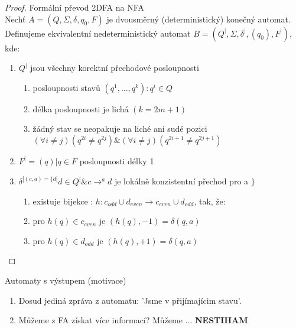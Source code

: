 \documentclass[../main.tex]{subfiles}
\begin{document}
\begin{theorem}
\begin{proof}
        Formální převod 2DFA na NFA\\

        Nechť $A = (Q,\Sigma, \delta, q_0,F)$ je dvousměrný (deterministický) konečný automat.
        Definujeme ekvivalentní nedeterministický automat $B = (Q^|,\Sigma,\delta^|,(q_0),F^|)$, kde:
        \begin{enumerate}
            \item $Q^|$ jsou všechny korektní přechodové posloupnosti
            \begin{enumerate}
                \item posloupnosti stavů $(q^1,\dots,q^k): q^i \in Q$
                \item délka posloupnosti je lichá $(k = 2m+1)$
                \item žádný stav se neopakuje na liché ani sudé pozici $(\forall i \neq j) (q^{2i} \neq q^{2j})
                \& (\forall i \neq j)(q^{2i+1}\neq q^{2j+1})$
            \end{enumerate}
            \item $F^| = {(q)|q \in F}$ posloupnosti délky 1
            \item $\delta^|(c,a) = \{d|d\in Q^| \& c\rightarrow^a  d $ je lokálně konzistentní přechod pro a $\}$
            \begin{enumerate}
                \item existuje bijekce : $h : c_{odd}\cup d_{even} \rightarrow c_{even}\cup d_{odd}$, tak, že:
                \item pro $h(q) \in c_{even}$ je $(h(q),-1) = \delta(q,a)$
                \item pro $h(q) \in d_{odd}$ je $(h(q),+1) = \delta(q,a)$
            \end{enumerate}
        \end{enumerate}
    \end{proof} 
\end{theorem}

Automaty s výstupem (motivace)\\

\begin{enumerate}
    \item Dosud jediná zpráva z automatu: 'Jsme v přijímajícim stavu'.
    \item Můžeme z FA získat více informací? Můžeme ... \textbf{NESTIHAM}
\end{enumerate}
\end{document}
